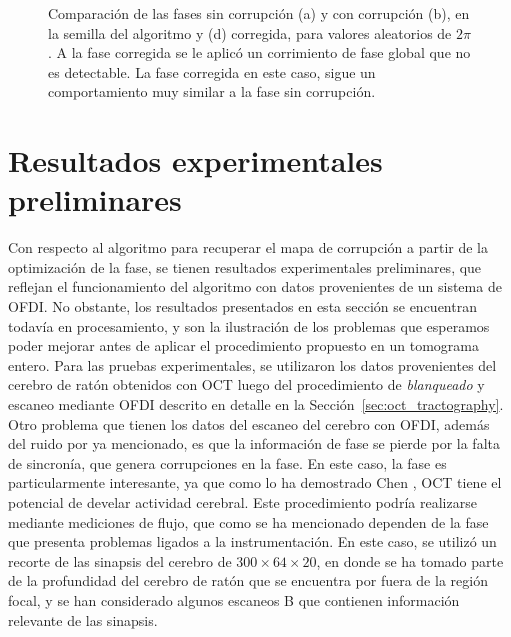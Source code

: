 \begin{figure}[ht!]
	\caption[Comparación de la fase recuperada con la optimización]{Comparación de las fases sin corrupción (a) y con corrupción (b), en la semilla del algoritmo y (d) corregida, para valores aleatorios de $2\pi$. A la fase corregida se le aplicó un corrimiento de fase global que no es detectable. La fase corregida en este caso, sigue un comportamiento muy similar a la fase sin corrupción.}
	\label{fig:phase_final}
\end{figure}


\section{Resultados experimentales preliminares}
\label{sec:resultados_experimentales_ofdi}

Con respecto al algoritmo para recuperar el mapa de corrupción a partir de la optimización de la fase, se tienen resultados experimentales preliminares, que reflejan el funcionamiento del algoritmo con datos provenientes de un sistema de OFDI. No obstante, los resultados presentados en esta sección se encuentran todavía en procesamiento, y son la ilustración de los problemas que esperamos poder mejorar antes de aplicar el procedimiento propuesto en un tomograma entero. Para las pruebas experimentales, se utilizaron los datos provenientes del cerebro de ratón obtenidos con OCT luego del procedimiento de \textit{blanqueado} y escaneo mediante OFDI descrito en detalle en la Sección~\ref{sec:oct_tractography}. Otro problema que tienen los datos del escaneo del cerebro con OFDI, además del ruido por \speckle ya mencionado, es que la información de fase se pierde por la falta de sincronía, que genera corrupciones en la fase. En este caso, la fase es particularmente interesante, ya que como lo ha demostrado Chen \etal \cite{Chen2009}, OCT tiene el potencial de develar actividad cerebral. Este procedimiento podría realizarse mediante mediciones de flujo, que como se ha mencionado dependen de la fase que presenta problemas ligados a la instrumentación. En este caso, se utilizó un recorte de las sinapsis del cerebro de $300\times64\times20$, en donde se ha tomado parte de la profundidad del cerebro de ratón que se encuentra por fuera de la región focal, y se han considerado algunos escaneos B que contienen información relevante de las sinapsis.

